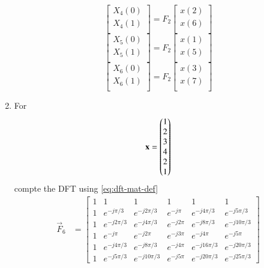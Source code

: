 \documentclass[journal,12pt,twocolumn]{IEEEtran}
\renewcommand\thesection{\arabic{section}}
\begin{document}
\begin{enumerate}[label=\arabic*.,ref=\thesection.\theenumi]
\begin{equation}
\begin{bmatrix}
			X_{4}(0) \\ 
			X_{4}(1)\\ 
		\end{bmatrix}
		= F_{2}
		\begin{bmatrix}
			x(2) \\ 
			x(6) \\ 
		\end{bmatrix}
	\end{equation}
	\begin{equation}
		\begin{bmatrix}
			X_{5}(0) \\ 
			X_{5}(1)\\ 
		\end{bmatrix}
		= F_{2}
		\begin{bmatrix}
			x(1) \\ 
			x(5) \\ 
		\end{bmatrix}
	\end{equation}
	\begin{equation}
		\begin{bmatrix}
			X_{6}(0) \\ 
			X_{6}(1)\\ 
		\end{bmatrix}
		= F_{2}
		\begin{bmatrix}
			x(3) \\ 
			x(7) \\ 
		\end{bmatrix}
	\end{equation}
	\item For 
	\begin{align}
		\mathbf{x} = \begin{pmatrix}1\\2\\3\\4\\2\\1\end{pmatrix}
		\label{eq:equation1}
	\end{align}
	compte the DFT  
	using 
	\eqref{eq:dft-mat-def}\\
	\solution \begin{align}
		\vec{F}_6&=\begin{bmatrix}
			1&1&1&1&1&1\\1&e^{-j \pi/3 }&e^{-j 2 \pi/3 }&e^{-j \pi }&e^{-j 4 \pi/3 }&e^{-j 5 \pi/3 }\\1&e^{-j 2 \pi/3 }&e^{-j 4 \pi/3 }&e^{-j 2 \pi }&e^{-j 8\pi/3 }&e^{-j 10 \pi/3 }\\1&e^{-j \pi }&e^{-j 2 \pi }&e^{-j 3 \pi }&e^{-j 4 \pi }&e^{-j 5 \pi }\\1&e^{-j 4 \pi/3 }&e^{-j 8 \pi/3 }&e^{-j 4 \pi }&e^{-j 16 \pi/3 }&e^{-j 20 \pi/3 }\\1&e^{-j 5 \pi/3 }&e^{-j 10 \pi/3 }&e^{-j 5 \pi }&e^{-j 20 \pi/3 }&e^{-j 25 \pi/3 }

\end{bmatrix}
\end{align}
\end{enumerate}
\end{document}
